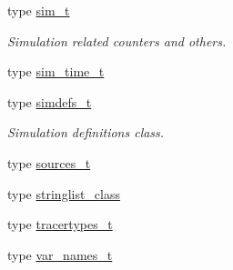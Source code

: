 \begin{DoxyCompactItemize}
type \mbox{\hyperlink{structsimulationglobals__mod_1_1sim__t}{sim\+\_\+t}}
\begin{DoxyCompactList}\small\item\em Simulation related counters and others. \end{DoxyCompactList}\item 
type \mbox{\hyperlink{structsimulationglobals__mod_1_1sim__time__t}{sim\+\_\+time\+\_\+t}}
\item 
type \mbox{\hyperlink{structsimulationglobals__mod_1_1simdefs__t}{simdefs\+\_\+t}}
\begin{DoxyCompactList}\small\item\em Simulation definitions class. \end{DoxyCompactList}\item 
type \mbox{\hyperlink{structsimulationglobals__mod_1_1sources__t}{sources\+\_\+t}}
\item 
type \mbox{\hyperlink{structsimulationglobals__mod_1_1stringlist__class}{stringlist\+\_\+class}}
\item 
type \mbox{\hyperlink{structsimulationglobals__mod_1_1tracertypes__t}{tracertypes\+\_\+t}}
\item 
type \mbox{\hyperlink{structsimulationglobals__mod_1_1var__names__t}{var\+\_\+names\+\_\+t}}
\end{DoxyCompactItemize}
